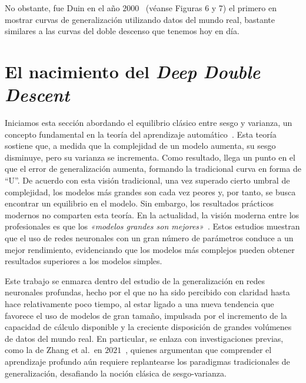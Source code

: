 No obstante, fue Duin en el año $2000$~\cite{Duin2000} (véanse Figuras 6 y 7) el primero en mostrar curvas de generalización utilizando datos del mundo real, bastante similares a las curvas del doble descenso que tenemos hoy en día.

\section{El nacimiento del \textit{Deep Double Descent}}\label{}

Iniciamos esta sección abordando el equilibrio clásico entre sesgo y varianza, un concepto fundamental en la teoría del aprendizaje automático~\cite{Geman1992, Hastie2001, Bengio2010}. Esta teoría sostiene que, a medida que la complejidad de un modelo aumenta, su sesgo disminuye, pero su varianza se incrementa. Como resultado, llega un punto en el que el error de generalización aumenta, formando la tradicional curva en forma de ``U''. De acuerdo con esta visión tradicional, una vez superado cierto umbral de complejidad, los modelos más grandes son cada vez peores y, por tanto, se busca encontrar un equilibrio en el modelo. Sin embargo, los resultados prácticos modernos no comparten esta teoría. En la actualidad, la visión moderna entre los profesionales es que los \emph{«modelos grandes son mejores»}~\cite{Krizhevsky2012, Neal2019, Huang2019, Szegedy2014}. Estos estudios muestran que el uso de redes neuronales con un gran número de parámetros conduce a un mejor rendimiento, evidenciando que los modelos más complejos pueden obtener resultados superiores a los modelos simples.

Este trabajo se enmarca dentro del estudio de la generalización en redes neuronales profundas, hecho por el que no ha sido percibido con claridad hasta hace relativamente poco tiempo, al estar ligado a una nueva tendencia que favorece el uso de modelos de gran tamaño, impulsada por el incremento de la capacidad de cálculo disponible y la creciente disposición de grandes volúmenes de datos del mundo real. En particular, se enlaza con investigaciones previas, como la de Zhang et al.\ en $2021$~\cite{Zhang2021}, quienes argumentan que comprender el aprendizaje profundo aún requiere replantearse los paradigmas tradicionales de generalización, desafiando la noción clásica de sesgo-varianza.


